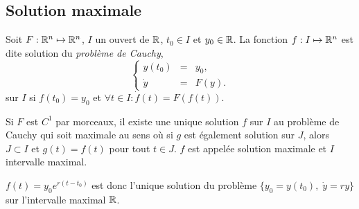 \subsection{Solution maximale} 

\begin{definition}
  Soit $F : \mathbb{R}^n \mapsto \mathbb{R}^n$, $I$ un ouvert de $\mathbb{R}$, $t_0 \in I$ et $y_0 \in \mathbb{R}$. La fonction $f : I \mapsto \mathbb{R}^n$ est dite solution du \emph{problème de Cauchy}, 
  $$
  \left\{\begin{array}{rcl}
          y(t_0) & = & y_0, \\
          \dot y & = & F(y).
        \end{array}\right.
  $$
  sur $I$ si $f(t_0) = y_0$ et $\forall t \in I: \dot f(t) = F(f(t))$.
\end{definition}

\begin{theorem}
  Si $F$ est $C^1$ par morceaux, il existe une unique solution $f$ sur $I$ au problème de Cauchy qui soit maximale au sens où si $g$ est également solution sur $J$, alors $J \subset I$ et $g(t) = f(t)$ pour tout $t \in J$. $f$ est appelée solution maximale et $I$ intervalle maximal.
\end{theorem}

\remark
$f(t) = y_0 e^{r(t-t_0)}$ est donc l'unique solution du problème $\{y_0 = y(t_0), \; \dot y = r y\}$ sur l'intervalle maximal $\mathbb{R}$.


